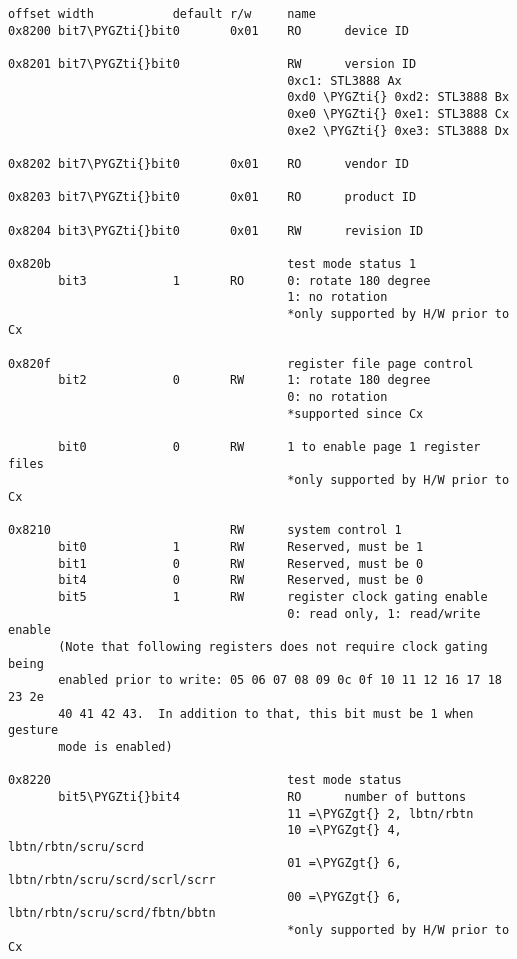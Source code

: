 \documentclass[a4paper,8pt,english]{sphinxmanual}
\def\PYGZgt{\char`\>}
\def\PYGZti{\char`\~}
\begin{document}
\begin{Verbatim}[commandchars=\\\{\}]
offset width           default r/w     name
0x8200 bit7\PYGZti{}bit0       0x01    RO      device ID

0x8201 bit7\PYGZti{}bit0               RW      version ID
                                       0xc1: STL3888 Ax
                                       0xd0 \PYGZti{} 0xd2: STL3888 Bx
                                       0xe0 \PYGZti{} 0xe1: STL3888 Cx
                                       0xe2 \PYGZti{} 0xe3: STL3888 Dx

0x8202 bit7\PYGZti{}bit0       0x01    RO      vendor ID

0x8203 bit7\PYGZti{}bit0       0x01    RO      product ID

0x8204 bit3\PYGZti{}bit0       0x01    RW      revision ID

0x820b                                 test mode status 1
       bit3            1       RO      0: rotate 180 degree
                                       1: no rotation
                                       *only supported by H/W prior to Cx

0x820f                                 register file page control
       bit2            0       RW      1: rotate 180 degree
                                       0: no rotation
                                       *supported since Cx

       bit0            0       RW      1 to enable page 1 register files
                                       *only supported by H/W prior to Cx

0x8210                         RW      system control 1
       bit0            1       RW      Reserved, must be 1
       bit1            0       RW      Reserved, must be 0
       bit4            0       RW      Reserved, must be 0
       bit5            1       RW      register clock gating enable
                                       0: read only, 1: read/write enable
       (Note that following registers does not require clock gating being
       enabled prior to write: 05 06 07 08 09 0c 0f 10 11 12 16 17 18 23 2e
       40 41 42 43.  In addition to that, this bit must be 1 when gesture
       mode is enabled)

0x8220                                 test mode status
       bit5\PYGZti{}bit4               RO      number of buttons
                                       11 =\PYGZgt{} 2, lbtn/rbtn
                                       10 =\PYGZgt{} 4, lbtn/rbtn/scru/scrd
                                       01 =\PYGZgt{} 6, lbtn/rbtn/scru/scrd/scrl/scrr
                                       00 =\PYGZgt{} 6, lbtn/rbtn/scru/scrd/fbtn/bbtn
                                       *only supported by H/W prior to Cx


\end{Verbatim}
\end{document}
